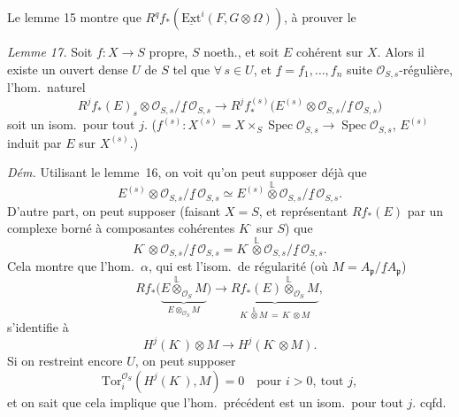\documentclass[11pt,a4paper]{article}
\begin{document}
Le lemme  15 montre que  \ill{}
$R^{q} f_{*}(\underline{\mathrm{Ext}}^{i}(F, G \otimes \Omega))$,
\struck{\ill{}} à prouver le

\emph{Lemme 17.} Soit $f \colon X \to S$ propre, $S$ noeth., et soit $E$
cohérent sur $X$. Alors il existe un ouvert dense $U$ de $S$ tel que
$\forall\, s \in U$, et $\underline{f} = f_1, \ldots, f_n$ suite
$\mathcal{O}_{S,s}$-régulière, l'hom.\ naturel
\[
  R^{j} f_{*}(E)_s \otimes \mathcal{O}_{S,s}/\underline{f}\,\mathcal{O}_{S,s}
  \longrightarrow
  R^{j} f^{(s)}_{*}\bigl(E^{(s)} \otimes \mathcal{O}_{S,s}/\underline{f}\,\mathcal{O}_{S,s}\bigr)
\]
soit un isom.\ pour tout $j$. ($f^{(s)} \colon X^{(s)} = X \times_S
\operatorname{Spec} \mathcal{O}_{S,s} \to \operatorname{Spec}
\mathcal{O}_{S,s}$, $E^{(s)}$ induit par $E$ sur $X^{(s)}$.)

\emph{Dém.} Utilisant le lemme~16, on voit qu'on peut supposer déjà que
\[
  E^{(s)} \otimes \mathcal{O}_{S,s}/\underline{f}\,\mathcal{O}_{S,s}
  \simeq
  E^{(s)} \overset{\mathbb{L}}{\otimes} \mathcal{O}_{S,s}/\underline{f}\,\mathcal{O}_{S,s} .
\]
D'autre part, on peut supposer \struck{\ill{}} (faisant $X = S$, et
représentant $Rf_{*}(E)$ par un complexe borné à composantes cohérentes
$K^{\cdot}$ sur $S$) que
\[
  K^{\cdot} \otimes \mathcal{O}_{S,s}/\underline{f}\,\mathcal{O}_{S,s}
  = K^{\cdot} \overset{\mathbb{L}}{\otimes} \mathcal{O}_{S,s}/\underline{f}\,\mathcal{O}_{S,s} .
\]
Cela montre que l'hom.\ $\alpha$, qui est l'isom.\ de régularité
(où $M = A_{\mathfrak{p}}/\underline{f} A_{\mathfrak{p}}$)
\[
  Rf_{*}\bigl(\underbrace{E \overset{\mathbb{L}}{\otimes}_{\mathcal{O}_S} M}_{E \otimes_{\mathcal{O}_S} M}\bigr)
  \longrightarrow
  \underbrace{Rf_{*}(E) \overset{\mathbb{L}}{\otimes}_{\mathcal{O}_S} M}_{K^{\cdot} \overset{\mathbb{L}}{\otimes} M \,=\, K^{\cdot} \otimes M},
\]
s'identifie à
\[
  H^{j}(K^{\cdot}) \otimes M \to H^{j}(K^{\cdot} \otimes M) .
\]
Si on restreint encore $U$, on peut supposer
\[
  \mathrm{Tor}_i^{\mathcal{O}_S}(H^{j}(K^{\cdot}), M) = 0 \quad \text{pour } i > 0,\ \text{tout } j,
\]
et on sait que cela implique que l'hom.\ précédent est un isom.\ pour tout $j$.
cqfd.
\end{document}
